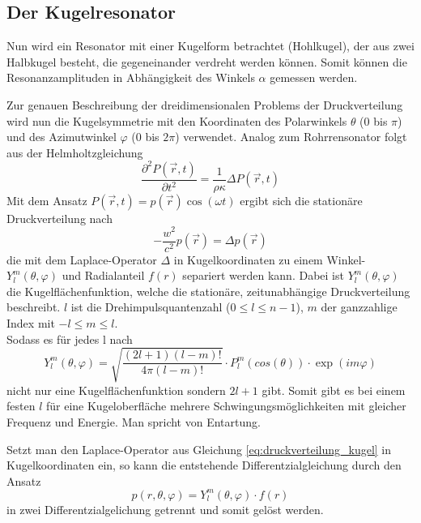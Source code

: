 \subsection{Der Kugelresonator}
Nun wird ein Resonator mit einer Kugelform betrachtet (Hohlkugel), der aus zwei Halbkugel besteht, die gegeneinander verdreht werden können.
Somit können die Resonanzamplituden in Abhängigkeit des Winkels $\alpha$ gemessen werden.

Zur genauen Beschreibung der dreidimensionalen Problems der Druckverteilung wird nun die Kugelsymmetrie mit den Koordinaten des Polarwinkels $\theta$ (0 bis $\pi$)
und des Azimutwinkel $\varphi$ (0 bis $2\pi$) verwendet.
Analog zum Rohrrensonator folgt aus der Helmholtzgleichung
\begin{equation}
    \frac{\partial^2 P(\vec{r}{,}t)}{\partial t^2}=\frac{1}{\rho\kappa}\Delta P(\vec{r}{,}t)
\end{equation}
Mit dem Ansatz $P(\vec{r}{,}t)=p(\vec{r})\cos{(\omega t)}$ ergibt sich die stationäre 
Druckverteilung nach
\begin{equation}
    -\frac{w^2}{c^2}p(\vec{r})=\Delta p(\vec{r})
    \label{eq:druckverteilung_kugel}
\end{equation}
die mit dem Laplace-Operator $\Delta$ in Kugelkoordinaten zu einem Winkel- $Y_l^m(\theta{,}\varphi)$ und 
Radialanteil $f(r)$ separiert werden kann. Dabei ist $Y_l^m(\theta{,}\varphi)$ die Kugelflächenfunktion, welche die 
stationäre, zeitunabhängige Druckverteilung beschreibt. $l$ ist die Drehimpulsquantenzahl ($0\leq l \leq n-1$),
$m$ der ganzzahlige Index mit $-l \leq m \leq l$.\\ Sodass es für jedes l nach
\begin{equation}
    Y^m_l(\theta{,}\varphi)=\sqrt{\frac{(2l+1)(l-m)!}{4\pi(l-m)!}}\cdot P_l^m(cos(\theta)) \cdot \exp({im\varphi})
\end{equation}
nicht nur eine Kugelflächenfunktion sondern $2l+1$ gibt. Somit gibt es bei einem festen $l$ für eine Kugeloberfläche
mehrere Schwingungsmöglichkeiten mit gleicher Frequenz und Energie. Man spricht von Entartung.

Setzt man den Laplace-Operator aus Gleichung \ref{eq:druckverteilung_kugel} in Kugelkoordinaten ein,
so kann die entstehende Differentzialgleichung durch den Ansatz
\begin{equation}
    p(r{,}\theta{,}\varphi)=Y_l^m(\theta{,}\varphi)\cdot f(r)
\end{equation}
in zwei Differentzialgelichung getrennt und somit gelöst werden.

